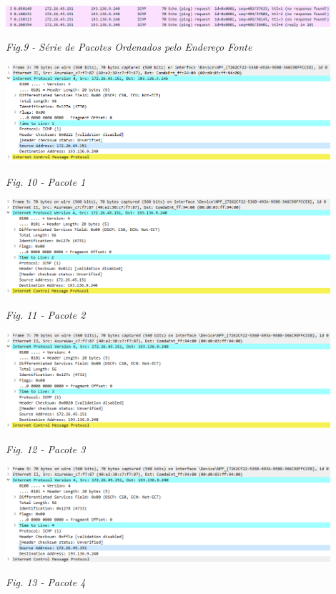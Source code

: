 \documentclass{article}
\begin{document}
\begin{center}
\includegraphics[width=12cm]{2.png}\par\caption{\textit{Fig.9 - Série de Pacotes Ordenados pelo Endereço Fonte}}\par\vspace{0.1cm}
\end{center}
\begin{center}
\includegraphics[width=12cm]{3.png}\par\caption{\textit{Fig. 10 - Pacote 1}}\par\vspace{0.2cm}
\end{center}
\begin{center}
\includegraphics[width=12cm]{4.png}\par\caption{\textit{Fig. 11 - Pacote 2}}\par\vspace{0.3cm}
\end{center}
\begin{center}
\includegraphics[width=12cm]{5.png}\par\caption{\textit{Fig. 12 - Pacote 3}}\par\vspace{0.5cm}
\end{center}
\begin{center}
\includegraphics[width=12cm]{6.png}\par\caption{\textit{Fig. 13 - Pacote 4}}\par\vspace{0.5cm}
\end{center}
\end{document}
